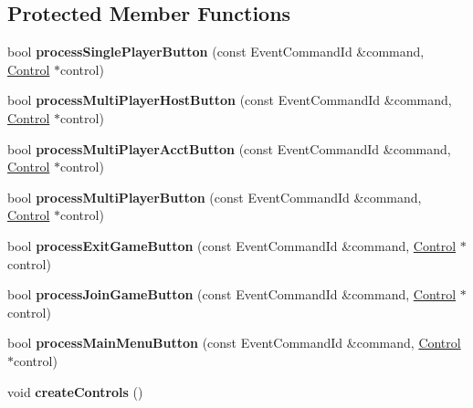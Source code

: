 \subsection*{Protected Member Functions}
\begin{DoxyCompactItemize}
\item 
bool {\bfseries process\+Single\+Player\+Button} (const Event\+Command\+Id \&command, \hyperlink{classControl}{Control} $\ast$control)\hypertarget{classGameMenu_a8df58220dc170bb9a8d31eae89fa6e31}{}\label{classGameMenu_a8df58220dc170bb9a8d31eae89fa6e31}

\item 
bool {\bfseries process\+Multi\+Player\+Host\+Button} (const Event\+Command\+Id \&command, \hyperlink{classControl}{Control} $\ast$control)\hypertarget{classGameMenu_a3390f39560f7bd43a073a1d2eb7b79fc}{}\label{classGameMenu_a3390f39560f7bd43a073a1d2eb7b79fc}

\item 
bool {\bfseries process\+Multi\+Player\+Acct\+Button} (const Event\+Command\+Id \&command, \hyperlink{classControl}{Control} $\ast$control)\hypertarget{classGameMenu_a5a54f42d56b82eacf369ada7ed0ce725}{}\label{classGameMenu_a5a54f42d56b82eacf369ada7ed0ce725}

\item 
bool {\bfseries process\+Multi\+Player\+Button} (const Event\+Command\+Id \&command, \hyperlink{classControl}{Control} $\ast$control)\hypertarget{classGameMenu_aea599b67c859055f3939fd02fefec2b7}{}\label{classGameMenu_aea599b67c859055f3939fd02fefec2b7}

\item 
bool {\bfseries process\+Exit\+Game\+Button} (const Event\+Command\+Id \&command, \hyperlink{classControl}{Control} $\ast$control)\hypertarget{classGameMenu_a94197398ae16d4e7145b297f363e8bda}{}\label{classGameMenu_a94197398ae16d4e7145b297f363e8bda}

\item 
bool {\bfseries process\+Join\+Game\+Button} (const Event\+Command\+Id \&command, \hyperlink{classControl}{Control} $\ast$control)\hypertarget{classGameMenu_a5967f8fcafa1bd0de9794f911efd7e96}{}\label{classGameMenu_a5967f8fcafa1bd0de9794f911efd7e96}

\item 
bool {\bfseries process\+Main\+Menu\+Button} (const Event\+Command\+Id \&command, \hyperlink{classControl}{Control} $\ast$control)\hypertarget{classGameMenu_a1868758ca7585631ca0f429c76ee0b9c}{}\label{classGameMenu_a1868758ca7585631ca0f429c76ee0b9c}

\item 
void {\bfseries create\+Controls} ()\hypertarget{classGameMenu_a6f9a0e315c7a03dad0162e10e025cfcc}{}\label{classGameMenu_a6f9a0e315c7a03dad0162e10e025cfcc}

\end{DoxyCompactItemize}
